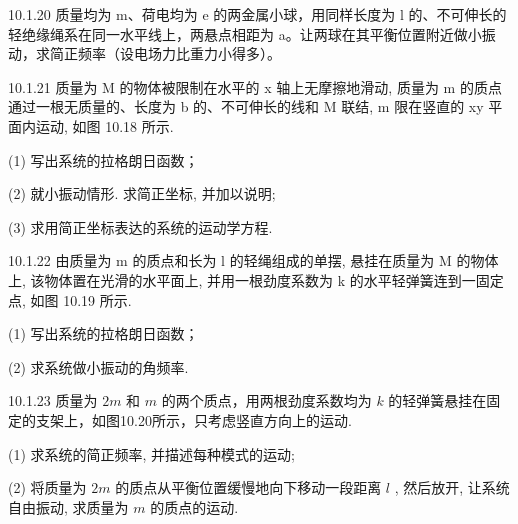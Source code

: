 \begin{problem}{10.1.20}
质量均为 m、荷电均为 e 的两金属小球，用同样长度为 l 的、不可伸长的轻绝缘绳系在同一水平线上，两悬点相距为 a。让两球在其平衡位置附近做小振动，求简正频率（设电场力比重力小得多）。
\end{problem}
\clearpage


\begin{problem}{10.1.21}
质量为 M 的物体被限制在水平的 x 轴上无摩擦地滑动, 质量为 m 的质点通过一根无质量的、长度为 b 的、不可伸长的线和 M 联结, m 限在竖直的 xy 平面内运动, 如图 10.18 所示.

(1) 写出系统的拉格朗日函数；

(2) 就小振动情形. 求简正坐标, 并加以说明;

(3) 求用简正坐标表达的系统的运动学方程.
\begin{center}

\end{center}
\end{problem}
\clearpage


\begin{problem}{10.1.22}
由质量为 m 的质点和长为 l 的轻绳组成的单摆, 悬挂在质量为 M 的物体上, 该物体置在光滑的水平面上, 并用一根劲度系数为 k 的水平轻弹簧连到一固定点, 如图 10.19 所示.

(1) 写出系统的拉格朗日函数；

(2) 求系统做小振动的角频率.
\begin{center}

\end{center}
\end{problem}
\clearpage


\begin{problem}{10.1.23}
质量为 $2m$ 和 $m$ 的两个质点，用两根劲度系数均为 $k$ 的轻弹簧悬挂在固定的支架上，如图10.20所示，只考虑竖直方向上的运动.

(1) 求系统的简正频率, 并描述每种模式的运动;

(2) 将质量为 $2m$ 的质点从平衡位置缓慢地向下移动一段距离 $l$ , 然后放开, 让系统自由振动, 求质量为 $m$ 的质点的运动.
\begin{center}

\end{center}
\end{problem}
\clearpage


